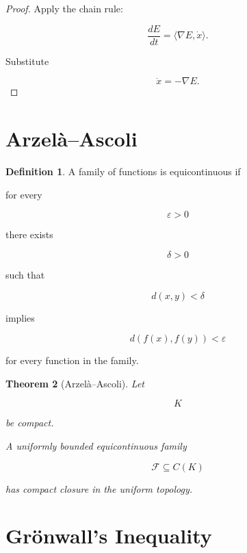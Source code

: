 \documentclass[11pt]{book}
\numberwithin{equation}{chapter}
\theoremstyle{definition}
\newtheorem{definition}{Definition}[chapter]
\theoremstyle{plain}
\newtheorem{theorem}[definition]{Theorem}
\begin{document}
\begin{proof}

Apply the chain rule:

\[
\frac{dE}{dt}
=
\langle
\nabla E,
\dot x
\rangle.
\]

Substitute

\[
\dot x
=
-\nabla E.
\]

\end{proof}


\section{Arzelà--Ascoli}

\begin{definition}

A family of functions is equicontinuous if

for every

\[
\varepsilon>0
\]

there exists

\[
\delta>0
\]

such that

\[
d(x,y)<\delta
\]

implies

\[
d(f(x),f(y))
<
\varepsilon
\]

for every function in the family.

\end{definition}


\begin{theorem}[Arzelà--Ascoli]

Let

\[
K
\]

be compact.

A uniformly bounded equicontinuous family

\[
\mathcal F
\subseteq
C(K)
\]

has compact closure in the uniform topology.

\end{theorem}


\section{Grönwall's Inequality}
\end{document}
